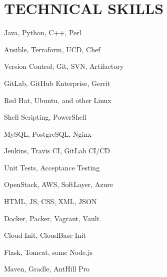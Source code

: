 \documentclass[]{dylan-resume}
\begin{document}
\begin{minipage}[t]{1.00\textwidth}
\section{TECHNICAL SKILLS}
\begin{center}
\begin{minipage}[b]{0.33333\textwidth}
\raggedright
Java, Python, C++, Perl \par
Ansible, Terraform, UCD, Chef \par
Version Control; Git, SVN, Artifactory \par
GitLab, GitHub Enterprise, Gerrit  \par
Red Hat, Ubuntu, and other Linux \par
\end{minipage}%
\begin{minipage}[b]{0.33333\textwidth}
\centering
Shell Scripting, PowerShell \par
MySQL, PostgreSQL, Nginx \par
Jenkins, Travis CI, GitLab CI/CD \par
Unit Tests, Acceptance Testing \par
OpenStack, AWS, SoftLayer, Azure 
\end{minipage}%
\begin{minipage}[b]{0.33333\textwidth}
\raggedleft
HTML, JS, CSS, XML, JSON \par
Docker, Packer, Vagrant, Vault \par
Cloud-Init, CloudBase Init \par
Flask, Tomcat, some Node.js \par
Maven, Gradle, AntHill Pro
\end{minipage}
\end{center}


\end{minipage}
\end{document}

